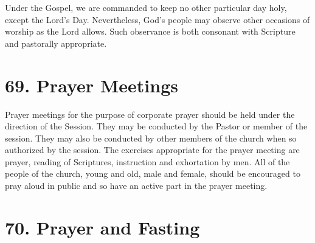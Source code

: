 \documentclass[
]{book}
\begin{document}
\protect\hypertarget{chapter-slug-68-other-occasions-of-public-worship}{\href{}{}}

\protect\hypertarget{68}{\href{}{}}Under the Gospel, we are commanded to keep no other particular day holy, except the Lord's Day. Nevertheless, God's people may observe other occasions of worship as the Lord allows. Such observance is both consonant with Scripture and pastorally appropriate.

\hypertarget{prayer-meetings}{%
\section*{69. Prayer Meetings}\label{prayer-meetings}}

\protect\hypertarget{chapter-slug-69-prayer-meetings}{\href{}{}}

\protect\hypertarget{69}{\href{}{}}Prayer meetings for the purpose of corporate prayer should be held under the direction of the Session. They may be conducted by the Pastor or member of the session. They may also be conducted by other members of the church when so authorized by the session. The exercises appropriate for the prayer meeting are prayer, reading of Scriptures, instruction and exhortation by men. All of the people of the church, young and old, male and female, should be encouraged to pray aloud in public and so have an active part in the prayer meeting.

\hypertarget{prayer-and-fasting}{%
\section*{70. Prayer and Fasting}\label{prayer-and-fasting}}

\protect\hypertarget{chapter-slug-70-prayer-and-fasting}{\href{}{}}
\end{document}
